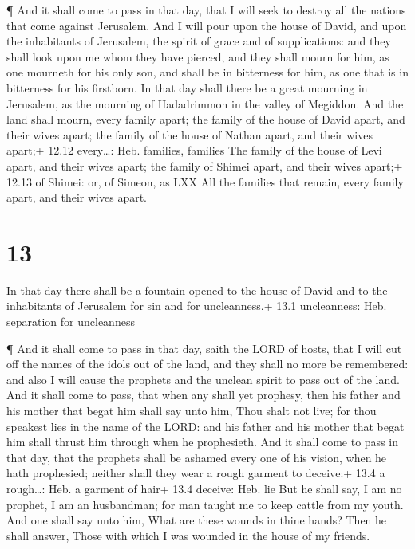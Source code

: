 ¶ And it shall come to pass in that day, that I will seek
to destroy all the nations that come against Jerusalem. 
And I will pour upon the house of David, and upon the inhabitants of
Jerusalem, the spirit of grace and of supplications: and they shall look
upon me whom they have pierced, and they shall mourn for him, as one
mourneth for his only son, and shall be in bitterness for him, as one
that is in bitterness for his firstborn.  In that day shall
there be a great mourning in Jerusalem, as the mourning of Hadadrimmon
in the valley of Megiddon.  And the land shall mourn, every
family apart; the family of the house of David apart, and their wives
apart; the family of the house of Nathan apart, and their wives apart;+
12.12 every\ldots: Heb. families, families  The family of
the house of Levi apart, and their wives apart; the family of Shimei
apart, and their wives apart;+ 12.13 of Shimei: or, of Simeon, as LXX
 All the families that remain, every family apart, and
their wives apart.

\hypertarget{section-12}{%
\section{13}\label{section-12}}

 In that day there shall be a fountain opened to the house
of David and to the inhabitants of Jerusalem for sin and for
uncleanness.+ 13.1 uncleanness: Heb. separation for uncleanness

 ¶ And it shall come to pass in that day, saith the LORD of
hosts, that I will cut off the names of the idols out of the land, and
they shall no more be remembered: and also I will cause the prophets and
the unclean spirit to pass out of the land.  And it shall
come to pass, that when any shall yet prophesy, then his father and his
mother that begat him shall say unto him, Thou shalt not live; for thou
speakest lies in the name of the LORD: and his father and his mother
that begat him shall thrust him through when he prophesieth.
 And it shall come to pass in that day, that the prophets
shall be ashamed every one of his vision, when he hath prophesied;
neither shall they wear a rough garment to deceive:+ 13.4 a rough\ldots:
Heb. a garment of hair+ 13.4 deceive: Heb. lie  But he shall
say, I am no prophet, I am an husbandman; for man taught me to keep
cattle from my youth.  And one shall say unto him, What are
these wounds in thine hands? Then he shall answer, Those with which I
was wounded in the house of my friends.

